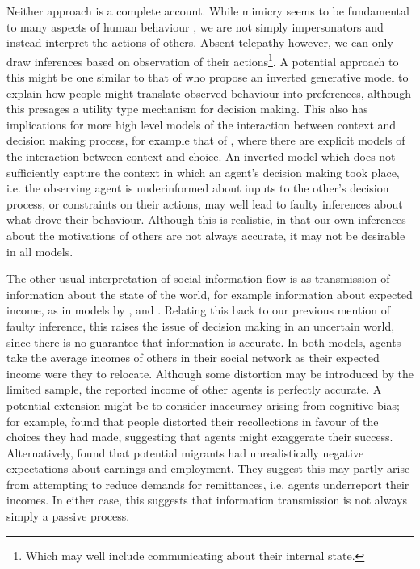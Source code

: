 \documentclass{article}
\begin{document}
Neither approach is a complete account. While mimicry seems to be fundamental to many aspects of human behaviour \citep{Chartrand1999}, we are not simply impersonators and instead interpret the actions of others. Absent telepathy however, we can only draw inferences based on observation of their actions\footnote{Which may well include communicating about their internal state.}. A potential approach to this might be one similar to that of \citet{Jern2011a} who propose an inverted generative model to explain how people might translate observed behaviour into preferences, although this presages a utility type mechanism for decision making. This also has implications for more high level models of the interaction between context and decision making process, for example that of \citet{Ben-Akiva2012}, where there are explicit models of the interaction between context and choice. An inverted model which does not sufficiently capture the context in which an agent's decision making took place, i.e. the observing agent is underinformed about inputs to the other's decision process, or constraints on their actions, may well lead to faulty inferences about what drove their behaviour. Although this is realistic, in that our own inferences about the motivations of others are not always accurate, it may not be desirable in all models.

The other usual interpretation of social information flow is as transmission of information about the state of the world, for example information about expected income, as in models by \citet{Filho2011}, and \citet{Klabunde2014}.  Relating this back to our previous mention of faulty inference, this raises the issue of decision making in an uncertain world, since there is no guarantee that information is accurate. In both models, agents take the average incomes of others in their social network as their expected income were they to relocate. Although some distortion may be introduced by the limited sample, the reported income of other agents is perfectly accurate. 
A potential extension might be to consider inaccuracy arising from cognitive bias; for example, \citet{Mather2000} found that people distorted their recollections in favour of the choices they had made, suggesting that agents might exaggerate their success. Alternatively, \citet{McKenzie2013} found that potential migrants had unrealistically negative expectations about earnings and employment. They suggest this may partly arise from attempting to reduce demands for remittances, i.e. agents underreport their incomes. In either case, this suggests that information transmission is not always simply a passive process.
\end{document}
